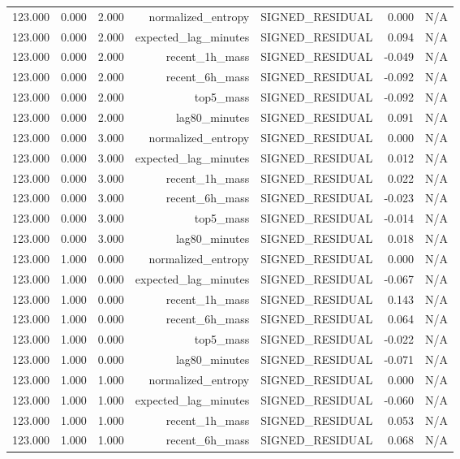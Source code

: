 \begin{table}[h!]
\begin{tabular}{lrrrrrr}
123.000 & 0.000 & 2.000 & normalized\_entropy & SIGNED\_RESIDUAL & 0.000 & N/A \\
123.000 & 0.000 & 2.000 & expected\_lag\_minutes & SIGNED\_RESIDUAL & 0.094 & N/A \\
123.000 & 0.000 & 2.000 & recent\_1h\_mass & SIGNED\_RESIDUAL & -0.049 & N/A \\
123.000 & 0.000 & 2.000 & recent\_6h\_mass & SIGNED\_RESIDUAL & -0.092 & N/A \\
123.000 & 0.000 & 2.000 & top5\_mass & SIGNED\_RESIDUAL & -0.092 & N/A \\
123.000 & 0.000 & 2.000 & lag80\_minutes & SIGNED\_RESIDUAL & 0.091 & N/A \\
123.000 & 0.000 & 3.000 & normalized\_entropy & SIGNED\_RESIDUAL & 0.000 & N/A \\
123.000 & 0.000 & 3.000 & expected\_lag\_minutes & SIGNED\_RESIDUAL & 0.012 & N/A \\
123.000 & 0.000 & 3.000 & recent\_1h\_mass & SIGNED\_RESIDUAL & 0.022 & N/A \\
123.000 & 0.000 & 3.000 & recent\_6h\_mass & SIGNED\_RESIDUAL & -0.023 & N/A \\
123.000 & 0.000 & 3.000 & top5\_mass & SIGNED\_RESIDUAL & -0.014 & N/A \\
123.000 & 0.000 & 3.000 & lag80\_minutes & SIGNED\_RESIDUAL & 0.018 & N/A \\
123.000 & 1.000 & 0.000 & normalized\_entropy & SIGNED\_RESIDUAL & 0.000 & N/A \\
123.000 & 1.000 & 0.000 & expected\_lag\_minutes & SIGNED\_RESIDUAL & -0.067 & N/A \\
123.000 & 1.000 & 0.000 & recent\_1h\_mass & SIGNED\_RESIDUAL & 0.143 & N/A \\
123.000 & 1.000 & 0.000 & recent\_6h\_mass & SIGNED\_RESIDUAL & 0.064 & N/A \\
123.000 & 1.000 & 0.000 & top5\_mass & SIGNED\_RESIDUAL & -0.022 & N/A \\
123.000 & 1.000 & 0.000 & lag80\_minutes & SIGNED\_RESIDUAL & -0.071 & N/A \\
123.000 & 1.000 & 1.000 & normalized\_entropy & SIGNED\_RESIDUAL & 0.000 & N/A \\
123.000 & 1.000 & 1.000 & expected\_lag\_minutes & SIGNED\_RESIDUAL & -0.060 & N/A \\
123.000 & 1.000 & 1.000 & recent\_1h\_mass & SIGNED\_RESIDUAL & 0.053 & N/A \\
123.000 & 1.000 & 1.000 & recent\_6h\_mass & SIGNED\_RESIDUAL & 0.068 & N/A \\

\end{tabular}
\end{table}
